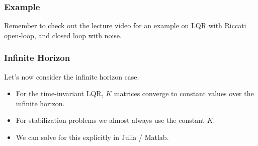 \subsubsection{Example}
Remember to check out the lecture video for an example on LQR with Riccati open-loop, and closed loop with noise. 

\subsubsection{Infinite Horizon}
Let's now consider the infinite horizon case.
\begin{itemize}
    \item For the time-invariant LQR, $K$ matrices converge to constant values over the infinite horizon. 
    \item For stabilization problems we almost always use the constant $K$.
    \item We can solve for this explicitly in Julia / Matlab.
\end{itemize}

